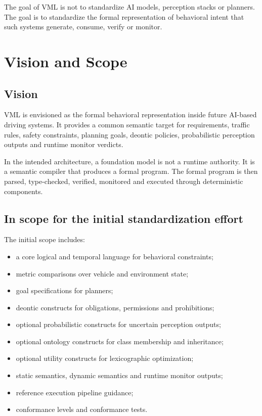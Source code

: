 \documentclass[11pt,a4paper]{article}
\newcommand{\VML}{\textsc{VML}}
\begin{document}
The goal of \VML{} is not to standardize AI models, perception stacks or planners. The goal is to standardize the formal representation of behavioral intent that such systems generate, consume, verify or monitor.

\section{Vision and Scope}
\subsection{Vision}
\VML{} is envisioned as the formal behavioral representation inside future AI-based driving systems. It provides a common semantic target for requirements, traffic rules, safety constraints, planning goals, deontic policies, probabilistic perception outputs and runtime monitor verdicts.

In the intended architecture, a foundation model is not a runtime authority. It is a semantic compiler that produces a formal program. The formal program is then parsed, type-checked, verified, monitored and executed through deterministic components.

\subsection{In scope for the initial standardization effort}
The initial scope includes:
\begin{itemize}
  \item a core logical and temporal language for behavioral constraints;
  \item metric comparisons over vehicle and environment state;
  \item goal specifications for planners;
  \item deontic constructs for obligations, permissions and prohibitions;
  \item optional probabilistic constructs for uncertain perception outputs;
  \item optional ontology constructs for class membership and inheritance;
  \item optional utility constructs for lexicographic optimization;
  \item static semantics, dynamic semantics and runtime monitor outputs;
  \item reference execution pipeline guidance;
  \item conformance levels and conformance tests.
\end{itemize}
\end{document}
